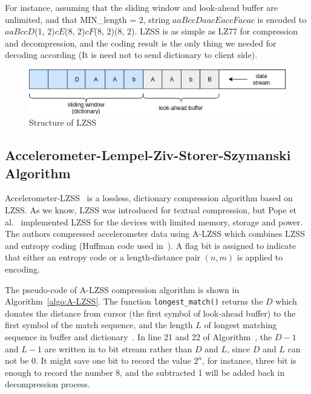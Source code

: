 For instance, assuming that the sliding window and look-ahead buffer are
unlimited, and that MIN\_length = 2,  string $aaBccDaacEaccFacac$ is encoded to
$aaBccD$(1, 2)$cE$(8, 2)$cF$(8, 2)(8, 2). LZSS is as simple as LZ77 for
compression and decompression, and the coding result is the only thing we needed
for decoding according (It is need not to send dictionary to client side).

\begin{figure}
    \centering
    \includegraphics[width=\textwidth]{figures/LZSS.png}
    \caption{Structure of LZSS}
    \label{fig:LZSS}
\end{figure}

\subsection{Accelerometer-Lempel-Ziv-Storer-Szymanski Algorithm}
Accelerometer-LZSS~\cite{pope2018accelerometer} is a lossless, dictionary
compression algorithm based on LZSS. As we know, LZSS was introduced for textual
compression, but Pope et al.~\cite{pope2018accelerometer} implemented LZSS for
the devices with limited memory, storage and power. The authors compressed
accelerometer data using A-LZSS which combines LZSS and entropy coding (Huffman
code used in~\cite{pope2018accelerometer}). A flag bit is assigned to indicate
that either an entropy code or a length-distance pair $(n, m)$ is applied to
encoding. 

The pseudo-code of A-LZSS compression algorithm is shown in
Algorithm~\ref{algo:A-LZSS}. The function \texttt{longest\_match()} returns the
$D$ which donates the distance from cursor (the first symbol of look-ahead
buffer) to the first symbol of the match sequence, and the length $L$ of longest
matching sequence in buffer and dictionary~\cite{pope2018accelerometer}. In line
21 and 22 of Algorithm~\cite{pope2018accelerometer}, the $D-1$ and $L-1$ are
written in to bit stream rather than $D$ and $L$, since $D$ and $L$ can not be
0. It might save one bit to record the value $2^n$, for instance, three bit is
enough to record the number 8, and the subtracted 1 will be added back in
decompression process.

